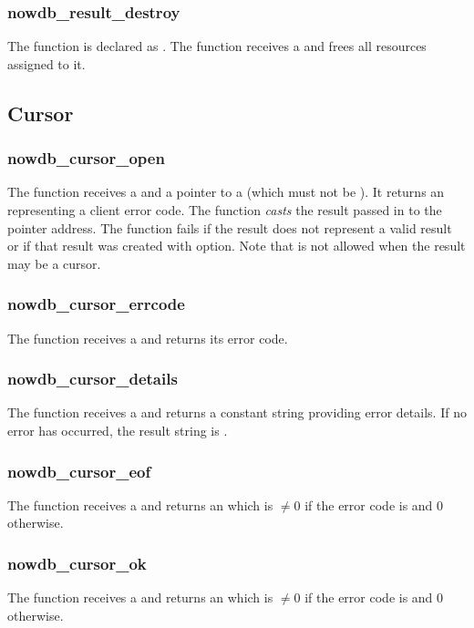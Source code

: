 \subsubsection{nowdb\_result\_destroy}
The function is declared as .
The function receives a 
and frees all resources assigned to it.

\subsection{Cursor}
\subsubsection{nowdb\_cursor\_open}
The function receives a 
and a pointer to a 
(which must not be ).
It returns an  representing
a client error code.
The function \emph{casts} the result
passed in to the pointer address.
The function fails if the result
does not represent a valid result
or if that result was created
with  option.
Note that 
is not allowed when the result
may be a cursor.

\subsubsection{nowdb\_cursor\_errcode}
The function receives a 
and returns its error code.

\subsubsection{nowdb\_cursor\_details}
The function receives a 
and returns a constant string providing error details.
If no error has occurred, the result string
is .

\subsubsection{nowdb\_cursor\_eof}
The function receives a 
and returns an  which is $\neq 0$
if the error code is 
and 0 otherwise.

\subsubsection{nowdb\_cursor\_ok}
The function receives a 
and returns an  which is $\neq 0$
if the error code is 
and 0 otherwise.

